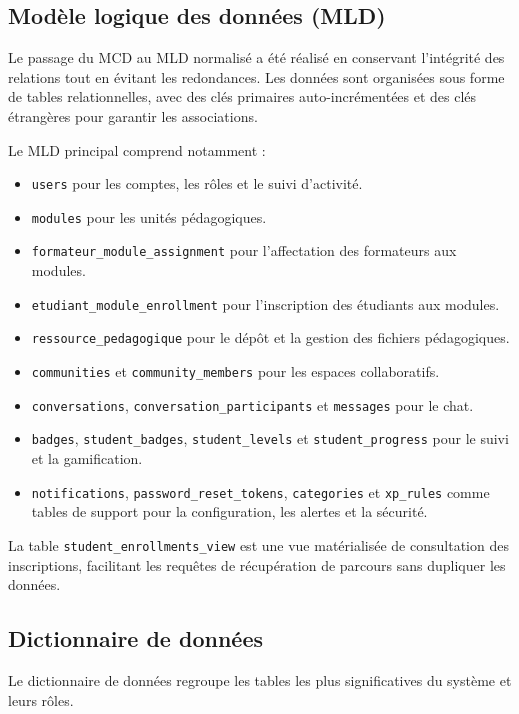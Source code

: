 \documentclass[12pt,a4paper,oneside]{report}
\begin{document}
\subsection{Modèle logique des données (MLD)}

Le passage du MCD au MLD normalisé a été réalisé en conservant l'intégrité des relations tout en évitant les redondances. Les données sont organisées sous forme de tables relationnelles, avec des clés primaires auto-incrémentées et des clés étrangères pour garantir les associations.

Le MLD principal comprend notamment :
\begin{itemize}
  \item \texttt{users} pour les comptes, les rôles et le suivi d'activité.
  \item \texttt{modules} pour les unités pédagogiques.
  \item \texttt{formateur\_module\_assignment} pour l'affectation des formateurs aux modules.
  \item \texttt{etudiant\_module\_enrollment} pour l'inscription des étudiants aux modules.
  \item \texttt{ressource\_pedagogique} pour le dépôt et la gestion des fichiers pédagogiques.
  \item \texttt{communities} et \texttt{community\_members} pour les espaces collaboratifs.
  \item \texttt{conversations}, \texttt{conversation\_participants} et \texttt{messages} pour le chat.
  \item \texttt{badges}, \texttt{student\_badges}, \texttt{student\_levels} et \texttt{student\_progress} pour le suivi et la gamification.
  \item \texttt{notifications}, \texttt{password\_reset\_tokens}, \texttt{categories} et \texttt{xp\_rules} comme tables de support pour la configuration, les alertes et la sécurité.
\end{itemize}

La table \texttt{student\_enrollments\_view} est une vue matérialisée de consultation des inscriptions, facilitant les requêtes de récupération de parcours sans dupliquer les données.

\subsection{Dictionnaire de données}

Le dictionnaire de données regroupe les tables les plus significatives du système et leurs rôles.
\end{document}
